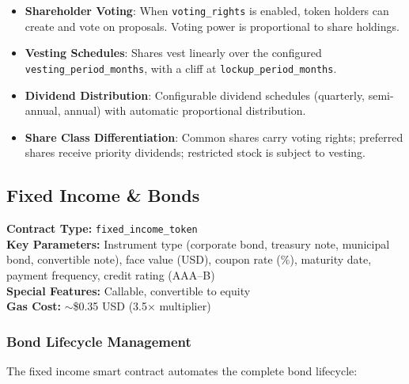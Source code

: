 \documentclass[11pt,a4paper,twoside]{article}
\begin{document}
\begin{itemize}
  \item \textbf{Shareholder Voting}: When \texttt{voting\_rights} is enabled, token holders can create and vote on proposals. Voting power is proportional to share holdings.
  \item \textbf{Vesting Schedules}: Shares vest linearly over the configured \texttt{vesting\_period\_months}, with a cliff at \texttt{lockup\_period\_months}.
  \item \textbf{Dividend Distribution}: Configurable dividend schedules (quarterly, semi-annual, annual) with automatic proportional distribution.
  \item \textbf{Share Class Differentiation}: Common shares carry voting rights; preferred shares receive priority dividends; restricted stock is subject to vesting.
\end{itemize}

\subsection{Fixed Income \& Bonds}
\label{subsec:fixed-income}

\begin{keyinsight}
\textbf{Contract Type:} \texttt{fixed\_income\_token}\\
\textbf{Key Parameters:} Instrument type (corporate bond, treasury note, municipal bond, convertible note), face value (USD), coupon rate (\%), maturity date, payment frequency, credit rating (AAA--B)\\
\textbf{Special Features:} Callable, convertible to equity\\
\textbf{Gas Cost:} $\sim$\$0.35 USD (3.5$\times$ multiplier)
\end{keyinsight}

\subsubsection{Bond Lifecycle Management}

The fixed income smart contract automates the complete bond lifecycle:
\end{document}
